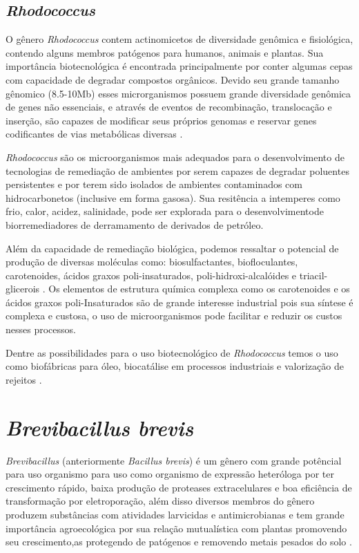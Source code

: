 \subsection{\textit{Rhodococcus}}
O gênero \textit{Rhodococcus} contem actinomicetos de diversidade genômica e fisiológica,
contendo alguns membros patógenos para humanos, animais e plantas. Sua importância biotecnológica
é encontrada principalmente por conter algumas cepas com capacidade de degradar compostos orgânicos.
Devido seu grande tamanho gênomico (8.5-10Mb) esses microrganismos possuem grande diversidade genômica
de genes não essenciais, e através de eventos de recombinação, translocação e inserção, são capazes
de modificar seus próprios genomas e reservar genes codificantes de vias metabólicas diversas \cite{cappelletti2019}.

\textit{Rhodococcus} são os microorganismos mais adequados para o desenvolvimento de
tecnologias de remediação de ambientes por serem capazes de degradar poluentes persistentes e por
terem sido isolados de ambientes contaminados com hidrocarbonetos 
(inclusive em forma gasosa)\cite{kuyukina2019}. Sua resitência a intemperes como frio, calor, acidez,
salinidade, pode ser explorada para o desenvolvimentode biorremediadores de derramamento de derivados
de petróleo.

Além da capacidade de remediação biológica, podemos ressaltar o potencial de produção de diversas moléculas
como: biosulfactantes, biofloculantes, carotenoides, ácidos graxos poli-insaturados, poli-hidroxi-alcalóides e
triacil-glicerois \cite{cappelletti2020}. Os elementos de estrutura química complexa como os
carotenoides e os ácidos graxos poli-Insaturados são de grande interesse industrial pois sua síntese 
é complexa e custosa, o uso de microorganismos pode facilitar e reduzir os custos nesses processos.

Dentre as possibilidades para o uso biotecnológico de \textit{Rhodococcus} temos o uso como biofábricas 
para óleo, biocatálise em processos industriais e valorização de rejeitos \cite{alvarez2021,krivoruchko2019,anthony2019,chatterjee2020}.

\section{\textit{Brevibacillus brevis}}
\textit{Brevibacillus} (anteriormente \textit{Bacillus brevis}) é um gênero com grande potêncial para uso organismo para uso como organismo de expressão heteróloga
por ter crescimento rápido, baixa produção de proteases extracelulares e boa eficiência de transformação
por eletroporação, além disso diversos membros do gênero produzem substâncias com atividades 
larvicidas e antimicrobianas e tem grande importância agroecológica por sua relação mutualística
com plantas promovendo seu crescimento,as protegendo de patógenos e removendo metais pesados do solo
\cite{panda2014brevibacillus,ray2020brevibacillus}.  

